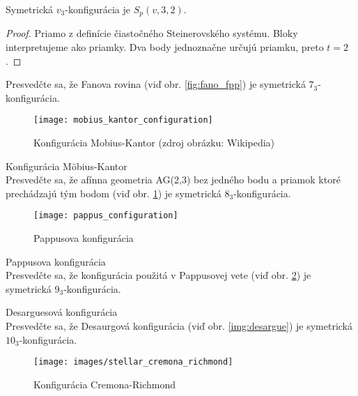 \begin{lemma}
	Symetrická $v_3$-konfigurácia je $S_p(v, 3, 2)$.
\end{lemma}

\begin{proof}
	Priamo z definície čiastočného Steinerovského systému. Bloky interpretujeme ako priamky. Dva body jednoznačne určujú priamku, preto $t = 2$.
\end{proof}

\begin{exercise}
	\label{ex:fano73}
	Presvedčte sa, že Fanova rovina (viď obr. \ref{fig:fano_fpp}) je symetrická $7_3$-konfigurácia.
\end{exercise}

\begin{figure}
	\centering
	\texttt{[image: mobius\_kantor\_configuration]}
	\caption{Konfigurácia Mobius-Kantor (zdroj obrázku: Wikipedia)}
	\label{img:mobiuskantorconfiguration}
\end{figure}

\begin{exercise}{Konfigurácia Möbius-Kantor}\\
	\label{ex:mobiuskantor83}
	Presvedčte sa, že afínna geometria AG(2,3) bez jedného bodu a priamok ktoré prechádzajú tým bodom (viď obr. \ref{img:mobiuskantorconfiguration}) je symetrická $8_3$-konfigurácia. 
\end{exercise}

\begin{figure}
	\centering
	\texttt{[image: pappus\_configuration]}
	\caption{Pappusova konfigurácia}
	\label{img:pappus}
\end{figure}

\begin{exercise}{Pappusova konfigurácia}\\
	\label{ex:pappus93}
	Presvedčte sa, že konfigurácia použitá v Pappusovej vete (viď obr. \ref{img:pappus}) je symetrická $9_3$-konfigurácia. 
\end{exercise}

\begin{exercise}{Desarguesová konfigurácia}\\
	\label{ex:desaurg103}
	Presvedčte sa, že Desaurgová konfigurácia (viď obr. \ref{img:desargue}) je symetrická $10_3$-konfigurácia. 
\end{exercise}

\begin{figure}
	\centering
	\texttt{[image: images/stellar\_cremona\_richmond]}
	\caption{Konfigurácia Cremona-Richmond\protect\footnotemark}
	\label{img:cremonarichmondconfiguration}
\end{figure}

